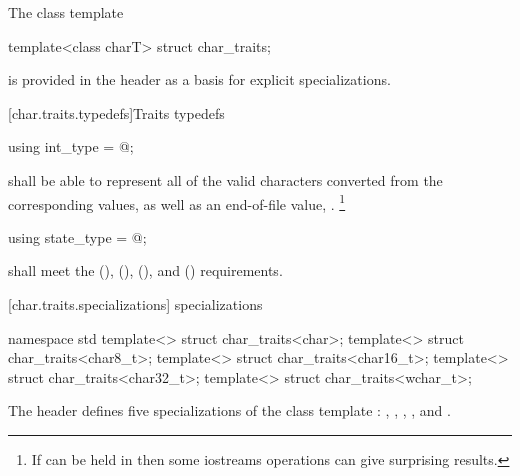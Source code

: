 \pnum
The class template

%
\begin{codeblock}
template<class charT> struct char_traits;
\end{codeblock}

is provided in the header
as a basis for explicit specializations.

[char.traits.typedefs]{Traits typedefs}

%
%
\begin{itemdecl}
using int_type = @\seebelow@;
\end{itemdecl}

\begin{itemdescr}
\pnum
\expects
{}
shall be able to represent all of the
valid characters converted from the corresponding
values, as well as an end-of-file value,
.%
\footnote{If
can be held in
then some iostreams operations can give surprising results.}
\end{itemdescr}

%
\begin{itemdecl}
using state_type = @\seebelow@;
\end{itemdecl}

\begin{itemdescr}
\pnum
\requires
{}
shall meet the
 (),
 (),
 (), and
 () requirements.
\end{itemdescr}

[char.traits.specializations]{ specializations}

%
\begin{codeblock}
namespace std {
  template<> struct char_traits<char>;
  template<> struct char_traits<char8_t>;
  template<> struct char_traits<char16_t>;
  template<> struct char_traits<char32_t>;
  template<> struct char_traits<wchar_t>;
}
\end{codeblock}

\pnum
The header
defines five
specializations of the class template
:
,
,
,
,
and
.


